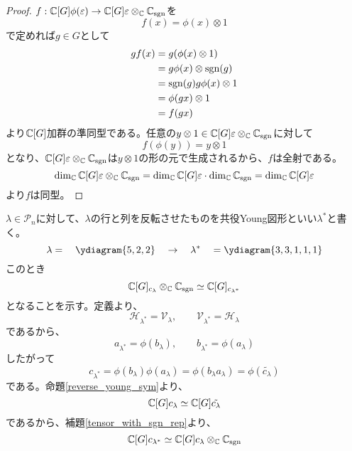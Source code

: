 \documentclass{ltjsreport}
\begin{document}
\begin{proof}
  $f:\mathbb{C}[G]\phi(\varepsilon)\rightarrow\mathbb{C}[G]\varepsilon\otimes_{\mathbb{C}} \mathbb{C}_{\mathrm{sgn}}$を
  \[
  f(x)=\phi(x)\otimes 1  
  \]
  で定めれば$g\in G$として
  \begin{align*}
    gf(x)
    &=g(\phi(x)\otimes 1)\\
    &=g\phi(x)\otimes \mathrm{sgn}(g)\\
    &=\mathrm{sgn}(g)g\phi(x)\otimes 1\\
    &=\phi(gx)\otimes 1\\
    &=f(gx)
  \end{align*}
  より$\mathbb{C}[G]$加群の準同型である。任意の$y\otimes 1\in \mathbb{C}[G]\varepsilon\otimes_{\mathbb{C}} \mathbb{C}_{\mathrm{sgn}}$に対して
  \[
  f(\phi(y))=y\otimes 1  
  \]
  となり、$\mathbb{C}[G]\varepsilon\otimes_{\mathbb{C}} \mathbb{C}_{\mathrm{sgn}}$は$y\otimes 1$の形の元で生成されるから、$f$は全射である。
  \[
  \dim_{\mathbb{C}}\mathbb{C}[G]\varepsilon\otimes_{\mathbb{C}} \mathbb{C}_{\mathrm{sgn}}=\dim_{\mathbb{C}}\mathbb{C}[G]\varepsilon\cdot\dim_{\mathbb{C}}\mathbb{C}_{\mathrm{sgn}}=  \dim_{\mathbb{C}}\mathbb{C}[G]\varepsilon 
  \]
  より$f$は同型。
\end{proof}


\begin{eg}
  $\lambda\in\mathcal{P}_n$に対して、$\lambda$の行と列を反転させたものを共役Young図形といい$\lambda^*$と書く。
  \[
  \lambda=\quad\ydiagram{5,2,2}\quad\rightarrow\quad\lambda^*\quad=\ydiagram{3,3,1,1,1}
  \]
  このとき
  \[
  \mathbb{C}[G]_{c_\lambda}\otimes_{\mathbb{C}}\mathbb{C}_{\mathrm{sgn}}\simeq \mathbb{C}[G]_{c_{\lambda^*}}
  \]
  となることを示す。定義より、
  \[
  \mathcal{H}_{\lambda^*}=\mathcal{V}_{\lambda},\qquad
  \mathcal{V}_{\lambda^*}=\mathcal{H}_{\lambda}  
  \]
  であるから、
  \[
  a_{\lambda^*}=\phi(b_{\lambda}),\qquad b_{\lambda^*}=\phi(a_{\lambda})
  \]
  したがって
  \[
  c_{\lambda^*}=\phi(b_\lambda)\phi(a_\lambda)=\phi(b_\lambda a_\lambda)=\phi(\tilde{c_\lambda})  
  \]
  である。命題\ref{reverse_young_sym}より、
  \[
  \mathbb{C}[G]c_\lambda\simeq \mathbb{C}[G]\tilde{c_\lambda}  
  \]
  であるから、補題\ref{tensor_with_sgn_rep}より、
  \[
  \mathbb{C}[G]c_{\lambda^*}\simeq \mathbb{C}[G]c_\lambda\otimes_{\mathbb{C}}\mathbb{C}_{\mathrm{sgn}}  
  \]
\end{eg}
\end{document}
